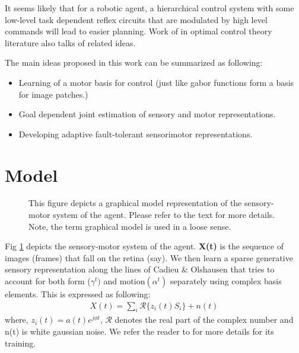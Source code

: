 \documentclass[conference]{IEEEtran}
\begin{document}
It seems likely that for a robotic agent, a hierarchical control system with some low-level task dependent reflex circuits that are modulated by high level commands will lead to easier planning. Work of \cite{todorov2004optimality} in optimal control theory literature also talks of related ideas. 

The main ideas proposed in this work can be summarized as following: 
\begin{itemize}
\item Learning of a motor basis for control (just like gabor functions form a basis for image patches.) 
\item Goal dependent joint estimation of sensory and motor representations.
\item Developing adaptive fault-tolerant sensorimotor representations. 
\end{itemize}


\section{Model}
\begin{figure}[t!]
\centering
{} 
\caption{This figure depicts a graphical model representation of the sensory-motor system of the agent. Please refer to the text for more details. Note, the term graphical model is used in a loose sense.}
\label{fig:sesemo}
\end{figure}

Fig \ref{fig:sesemo} depicts the sensory-motor system of the agent. \textbf{X(t)} is the sequence of images (frames) that fall on the retina (say). We then learn a sparse generative sensory representation along the lines of Cadieu \& Olshausen  \cite{cadieu2012learning} that tries to account for both form ($\gamma^{t})$  and motion$(\alpha^{t})$ separately using complex basis elements. This is expressed as following:
\begin{eqnarray}
X(t) = \sum_i \mathcal{R}\{z_i(t)S_i\} + n(t)
\end{eqnarray}
where, $z_i(t) = a(t)e^{j\phi t}$, $\mathcal{R}$ denotes the real part of the complex number and n(t) is white gaussian noise. We refer the reader to \cite{cadieu2012learning} for more details for its training.
\end{document}

